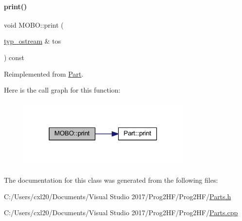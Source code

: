 \paragraph{\texorpdfstring{print()}{print()}\hspace{0.1cm}{\footnotesize\ttfamily [4/4]}}
{\footnotesize\ttfamily void M\+O\+B\+O\+::print (\begin{DoxyParamCaption}\item[{\mbox{\hyperlink{structtyp__ostream}{typ\+\_\+ostream}} \&}]{tos }\end{DoxyParamCaption}) const\hspace{0.3cm}{\ttfamily [virtual]}}



Reimplemented from \mbox{\hyperlink{class_part_ab6396030e8b7a724731a8b54bd4942fc}{Part}}.

Here is the call graph for this function\+:
\nopagebreak
\begin{figure}[H]
\begin{center}
\leavevmode
\includegraphics[width=246pt]{class_m_o_b_o_a3dd7e36103afbb4b6c09b65975317b9c_cgraph}
\end{center}
\end{figure}


The documentation for this class was generated from the following files\+:\begin{DoxyCompactItemize}
\item 
C\+:/\+Users/cxl20/\+Documents/\+Visual Studio 2017/\+Prog2\+H\+F/\+Prog2\+H\+F/\mbox{\hyperlink{_parts_8h}{Parts.\+h}}\item 
C\+:/\+Users/cxl20/\+Documents/\+Visual Studio 2017/\+Prog2\+H\+F/\+Prog2\+H\+F/\mbox{\hyperlink{_parts_8cpp}{Parts.\+cpp}}\end{DoxyCompactItemize}
